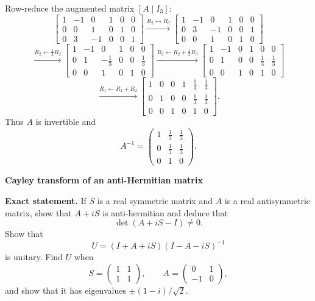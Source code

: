 \begin{solution}
Row-reduce the augmented matrix \([A\mid I_3]\):
\[
\left[\begin{array}{ccc|ccc}
	1&-1&0&1&0&0\\
	0&0&1&0&1&0\\
	0&3&-1&0&0&1
\end{array}\right]
\overset{R_2\leftrightarrow R_3}{\longrightarrow}
\left[\begin{array}{ccc|ccc}
	1&-1&0&1&0&0\\
	0&3&-1&0&0&1\\
	0&0&1&0&1&0
\end{array}\right]
\]
\[
\overset{R_2\leftarrow \frac13 R_2}{\longrightarrow}
\left[\begin{array}{ccc|ccc}
	1&-1&0&1&0&0\\
	0&1&-\frac13&0&0&\frac13\\
	0&0&1&0&1&0
\end{array}\right]
\overset{R_2\leftarrow R_2+\frac13 R_3}{\longrightarrow}
\left[\begin{array}{ccc|ccc}
	1&-1&0&1&0&0\\
	0&1&0&0&\frac13&\frac13\\
	0&0&1&0&1&0
\end{array}\right]
\]
\[
\overset{R_1\leftarrow R_1+R_2}{\longrightarrow}
\left[\begin{array}{ccc|ccc}
	1&0&0&1&\frac13&\frac13\\
	0&1&0&0&\frac13&\frac13\\
	0&0&1&0&1&0
\end{array}\right].
\]
Thus \(A\) is invertible and
\[
A^{-1}=\begin{pmatrix}
	1&\frac13&\frac13\\
	0&\frac13&\frac13\\
	0&1&0
\end{pmatrix}.
\]
\end{solution}

\begin{problem}[CP-I-0050]
\label{prob:cp-i-0050}
\textbf{Cayley transform of an anti-Hermitian matrix}

\textbf{Exact statement.}
\hspace*{1.5em}If $S$ is a real symmetric matrix and $A$ is a real antisymmetric matrix, show that $A+iS$ is anti-hermitian and deduce that
\[
\det(A+iS-I)\neq 0.
\]
Show that
\[
U=(I+A+iS)(I-A-iS)^{-1}
\]
is unitary. Find $U$ when
\[
S=\begin{pmatrix}1&1\\1&1\end{pmatrix},\qquad
A=\begin{pmatrix}0&1\\-1&0\end{pmatrix},
\]
and show that it has eigenvalues $\pm(1-i)/\sqrt2$.
\end{problem}

